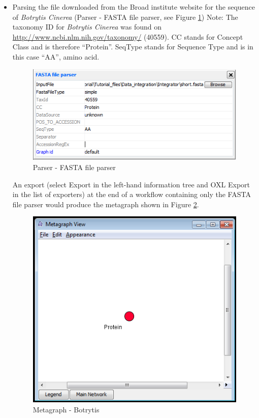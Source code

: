 \begin{itemize}
\item Parsing the file downloaded from the Broad institute website for the sequence of \textit{Botrytis Cinerea} 
(Parser - FASTA file parser, see Figure \ref{fig:integrator_fasta})
Note: The taxonomy ID for \textit{Botrytis Cinerea} was found on \url{http://www.ncbi.nlm.nih.gov/taxonomy/} (40559). 
CC stands for Concept Class and is therefore ``Protein''. 
SeqType stands for Sequence Type and is in this case ``AA'', amino acid.
\begin{figure}[H]
\centering
\includegraphics[scale=0.6]{images/Oct12/fasta.png} 
\caption{Parser - FASTA file parser}
\label{fig:integrator_fasta}
\end{figure}
An export (select Export in the left-hand information tree and OXL Export in the list of exporters) at the end of a workflow
containing only the FASTA file parser would produce the metagraph shown in Figure \ref{fig:metagraph_botrytis}.
\begin{figure}[H]
\centering
\includegraphics[scale=0.6]{images/Oct12/botrytis.png} 
\caption{Metagraph - Botrytis}
\label{fig:metagraph_botrytis}
\end{figure}


\end{itemize}
